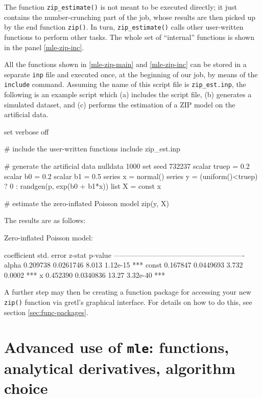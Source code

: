 The function \texttt{zip\_estimate()} is not meant to be executed
directly; it just contains the number-crunching part of the job, whose
results are then picked up by the end function \texttt{zip()}. In
turn, \texttt{zip\_estimate()} calls other user-written functions to
perform other tasks. The whole set of ``internal'' functions is shown
in the panel \ref{mle-zip-inc}.

All the functions shown in \ref{mle-zip-main} and \ref{mle-zip-inc} can
be stored in a separate \texttt{inp} file and executed once, at the
beginning of our job, by means of the \texttt{include}
command.  Assuming the name of this script file is
\texttt{zip\_est.inp}, the following is an example script which
(a) includes the script file, (b) generates a simulated dataset,
and (c) performs the estimation of a ZIP model on the artificial data.

\begin{code}
set verbose off

# include the user-written functions
include zip_est.inp

# generate the artificial data
nulldata 1000
set seed 732237
scalar truep = 0.2
scalar b0 = 0.2
scalar b1 = 0.5
series x = normal()
series y = (uniform()<truep) ? 0 : randgen(p, exp(b0 + b1*x))
list X = const x

# estimate the zero-inflated Poisson model
zip(y, X)
\end{code}

The results are as follows:

\begin{code}
Zero-inflated Poisson model:

             coefficient   std. error   z-stat   p-value 
  -------------------------------------------------------
  alpha       0.209738     0.0261746     8.013   1.12e-15 ***
  const       0.167847     0.0449693     3.732   0.0002   ***
  x           0.452390     0.0340836    13.27    3.32e-40 ***
\end{code}

A further step may then be creating a function package for accessing
your new \texttt{zip()} function via gretl's graphical interface. For
details on how to do this, see section \ref{sec:func-packages}.

\section{Advanced use of \texttt{mle}: functions, analytical
  derivatives, algorithm choice}
\label{sec:mle-adv}

